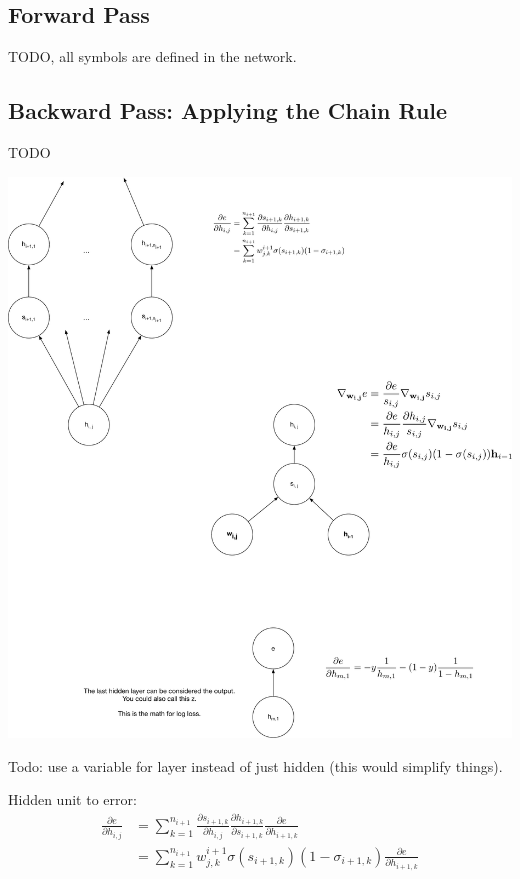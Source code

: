 \documentclass[assignment06_Solutions]{subfiles}
\begin{document}
\subsection{Forward Pass}

TODO, all symbols are defined in the network.

\subsection{Backward Pass: Applying the Chain Rule}
TODO


\includegraphics[width=\linewidth]{figures/singleneuroncloseup}



Todo: use a variable for layer instead of just hidden (this would simplify things).

Hidden unit to error:
\begin{align}
\frac{\partial{e}}{\partial{h_{i,j}}} &= \sum_{k=1}^{n_{i+1}} \frac{\partial s_{i+1, k}}{\partial h_{i,j}} \frac{\partial h_{i+1, k}}{\partial s_{i+1, k}} \frac{\partial e}{\partial h_{i+1, k}} \\
&= \sum_{k=1}^{n_{i+1}} w^{i+1}_{j,k} \sigma(s_{i+1,k})(1 - \sigma_{i+1,k})\frac{\partial e}{\partial h_{i+1, k}}
\end{align}
\end{document}
